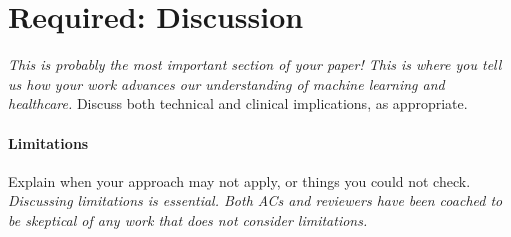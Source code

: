 \documentclass[pmlr]{jmlr}%
\begin{document}
\section{Required: Discussion} 

\emph{This is probably the most important section of your paper!  This
	is where you tell us how your work advances our understanding of
	machine learning and healthcare.}  Discuss both technical and
clinical implications, as appropriate.

\paragraph{Limitations}

Explain when your approach may not apply, or things you could not
check.  \emph{Discussing limitations is essential.  Both ACs and
	reviewers have been coached to be skeptical of any work that does
	not consider limitations.}





\end{document}
